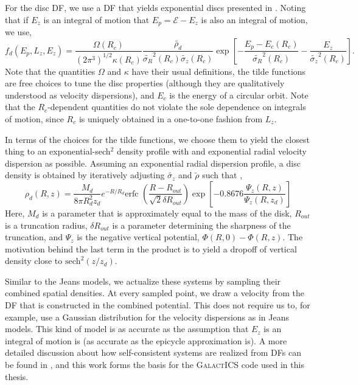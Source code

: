 For the disc DF, we use a DF that yields exponential discs presented in \citet{kd95galactics}. Noting that if $E_z$ is an integral of motion that $E_p = \mathcal{E} - E_z$ is also an integral of motion, we use,
\begin{equation}
f_d(E_p,L_z,E_z) = \frac{\Omega(R_c)}{(2 \pi^3)^{1/2} \kappa(R_c)} \frac{\tilde{\rho_d}}{\tilde{\sigma_R}^2(R_c) \tilde{\sigma_z}(R_c)} \exp\left[-\frac{E_p - E_c(R_c)}{\tilde{\sigma_R}^2(R_c)}  - \frac{E_z}{\tilde{\sigma_z}^2(R_c)}\right].
\end{equation}
Note that the quantities $\Omega$ and $\kappa$ have their usual definitions, the tilde functions are free choices to tune the disc properties (although they are qualitatively understood as velocity dispersions), and $E_c$ is the energy of a circular orbit. Note that the $R_c$-dependent quantities do not violate the sole dependence on integrals of motion, since $R_c$ is uniquely obtained in a one-to-one fashion from $L_z$.

In terms of the choices for the tilde functions, we choose them to yield the closest thing to an exponential-sech$^2$ density profile with and exponential radial velocity dispersion as possible. Assuming an exponential radial dispersion profile, a disc density is obtained by iteratively adjusting $\tilde{\sigma_z}$ and $\tilde{\rho}$ such that \citep{kd95galactics},
\begin{equation}
\rho_d(R,z) = \frac{M_d}{8 \pi R_d^2 z_d} e^{-R/R_d} \text{erfc }\left(\frac{R - R_{out}}{\sqrt{2} \delta R_{out}}\right) \exp \left[ -0.8676 \frac{\Psi_z(R,z)}{\Psi_z(R,z_d)}\right]
\end{equation}
Here, $M_d$ is a parameter that is approximately equal to the mass of the disk, $R_{out}$ is a truncation radius, $\delta R_{out}$ is a parameter determining the sharpness of the truncation, and $\Psi_z$ is the negative vertical potential, $\Phi(R,0) - \Phi(R,z)$. The motivation behind the last term in the product is to yield a dropoff of vertical density close to $\text{sech}^2(z/z_d)$.

Similar to the  Jeans models, we actualize these systems by sampling their combined spatial densities. At every sampled point, we draw a velocity from the DF that is constructed in the combined potential. This does not require us to, for example, use a Gaussian distribution for the velocity dispersions as in Jeans models. This kind of model is as accurate as the assumption that $E_z$ is an integral of motion is (as accurate as the epicycle approximation is). A more detailed discussion about how self-consistent systems are realized from DFs can be found in \citet{kd95galactics}, and this work forms the basis for the \textsc{GalactICS} code used in this thesis.

